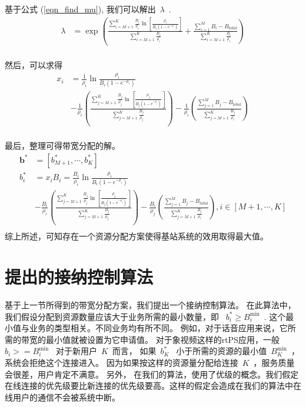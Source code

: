 基于公式 (\ref{eqn_find_mu}), 我们可以解出~$\lambda$~.
\begin{equation*}
\begin{split}
\lambda &= \exp \left( \frac{\sum_{i=M+1}^K \frac{B_i}{\rho_i} \ln \left[ \frac{\rho_i}{B_i(1-e^{-\rho_i})} \right]
}{\sum_{i=M+1}^K \frac{B_i}{\rho_i}} \right.
+ \left. \frac{ 
\sum_{i=1}^M B_i - B_{total}}{\sum_{i=M+1}^K \frac{B_i}{\rho_i}} \right)\\
\end{split}
\end{equation*}

然后，可以求得
%
\begin{equation}
\begin{split}
x_i & = \frac{1}{\rho_i} \ln \frac{\rho_i}{B_i(1-e^{-\rho_i})} \\
&-\frac{1}{\rho_i}\left( \frac{\sum_{j=M+1}^K \frac{B_j}{\rho_j} \ln \left[\frac{\rho_j}{B_j(1-e^{-\rho_j})}\right] 
}{\sum_{j=M+1}^K \frac{B_j}{\rho_j}} \right)
-\frac{1}{\rho_i}\left( \frac{ 
\sum_{j=1}^M B_j - B_{total}}{\sum_{j=M+1}^K \frac{B_j}{\rho_i}} \right) \\
\end{split}
\end{equation}
%

最后，整理可得带宽分配的解。
%
\begin{equation}
\begin{split}
\mathbf{b^*}& = [b^*_{M+1}, \cdots, b^*_{K}]\\
b_i^* & = x_iB_i = \frac{B_i}{\rho_i} \ln \frac{\rho_i}{B_i(1-e^{-\rho_i})} \\
&-\frac{B_i}{\rho_i}\left( \frac{\sum_{j=M+1}^K \frac{B_j}{\rho_j} \ln \left[\frac{\rho_j}{B_j(1-e^{-\rho_j})}\right] 
}{\sum_{j=M+1}^K \frac{B_j}{\rho_j}} \right)
 -\frac{B_i}{\rho_j}\left( \frac{ 
\sum_{j=1}^M B_j - B_{total}}{\sum_{j=M+1}^K \frac{B_j}{\rho_i}} \right), i \in [M+1, \cdots, K] \\
\end{split}
\label{eqn:chap_cacop:b_i_bw}
\end{equation}
综上所述，可知存在一个资源分配方案使得基站系统的效用取得最大值。
%
\section{提出的接纳控制算法}
\label{sec_alg}


基于上一节所得到的带宽分配方案，我们提出一个接纳控制算法。
在此算法中，我们假设分配到资源数量应该大于业务所需的最小数量，即
~$b_i^* \ge B_i^{\min}$~. 
这个最小值与业务的类型相关。不同业务均有所不同。
例如，对于话音应用来说，它所需的带宽的最小值就被设置为它申请值。
对于象视频这样的rtPS应用，一般~$b_i>=B_i^{\min}$~
对于新用户~$K$~而言，
如果~$b_K^*$~ 小于所需的资源的最小值~$B_K^{\min}$~，系统会拒绝这个连接进入。
因为如果按这样的资源量分配给连接~$K$~，服务质量会很差，用户肯定不满意。
另外，
在我们的算法，使用了优级的概念。我们假定在线连接的优先级要比新连接的优先级要高。这样的假定会造成在我们的算法中在线用户的通信不会被系统中断。


